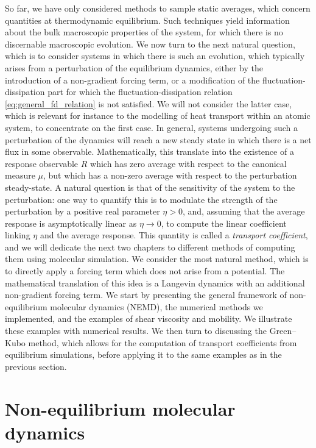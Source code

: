 So far, we have only considered methods to sample static averages, which concern quantities at thermodynamic equilibrium.
Such techniques yield information about the bulk macroscopic properties of the system, for which there is no discernable macroscopic evolution.
We now turn to the next natural question, which is to consider systems in which there is such an evolution,
 which typically arises from a perturbation of the equilibrium dynamics, either by the introduction of a non-gradient forcing term, 
 or a modification of the fluctuation-dissipation part for which the fluctuation-dissipation relation \eqref{eq:general_fd_relation} is not satisfied.
 We will not consider the latter case, which is relevant for instance to the modelling of heat transport within an atomic system, to concentrate on the first case.
 In general, systems undergoing such a perturbation of the dynamics will reach a new steady state in which there is a net flux in some observable.
 Mathematically, this translate into the existence of a response observable $R$ which has zero average with respect to the canonical measure $\mu$, but which has a non-zero average with respect to the perturbation steady-state.
 A natural question is that of the sensitivity of the system to the perturbation: one way to quantify this is to modulate the strength of the perturbation by a positive real parameter $\eta>0$, and,
  assuming that the average response is asymptotically linear as $\eta\to 0$, to compute the linear coefficient linking $\eta$ and the average response. 
  This quantity is called a \textit{transport coefficient}, and we will dedicate the next two chapters to different methods of computing them using molecular simulation.
  We consider the most natural method, which is to directly apply a forcing term which does not arise from a potential. 
  The mathematical translation of this idea is a Langevin dynamics with an additional non-gradient forcing term. 
  We start by presenting the general framework of non-equilibrium molecular dynamics (NEMD), the numerical methods we implemented, and the examples of shear viscosity and mobility. We illustrate these examples with numerical results.
  We then turn to discussing the Green--Kubo method, which allows for the computation of transport coefficients from equilibrium simulations, before applying it to the same examples as in the previous section.

\section{Non-equilibrium molecular dynamics}
